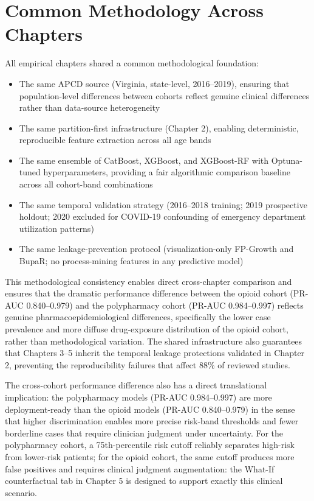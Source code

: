 \documentclass[
  12pt,
]{book}
\providecommand{\tightlist}{%
  \setlength{\itemsep}{0pt}\setlength{\parskip}{0pt}}
\begin{document}
\section{Common Methodology Across
Chapters}\label{common-methodology-across-chapters}

All empirical chapters shared a common methodological foundation:

\begin{itemize}
\tightlist
\item
  The same APCD source (Virginia, state-level, 2016--2019), ensuring
  that population-level differences between cohorts reflect genuine
  clinical differences rather than data-source heterogeneity
\item
  The same partition-first infrastructure (Chapter 2), enabling
  deterministic, reproducible feature extraction across all age bands
\item
  The same ensemble of CatBoost, XGBoost, and XGBoost-RF with
  Optuna-tuned hyperparameters, providing a fair algorithmic comparison
  baseline across all cohort-band combinations
\item
  The same temporal validation strategy (2016--2018 training; 2019
  prospective holdout; 2020 excluded for COVID-19 confounding of
  emergency department utilization patterns)
\item
  The same leakage-prevention protocol (visualization-only FP-Growth and
  BupaR; no process-mining features in any predictive model)
\end{itemize}

This methodological consistency enables direct cross-chapter comparison
and ensures that the dramatic performance difference between the opioid
cohort (PR-AUC 0.840--0.979) and the polypharmacy cohort (PR-AUC
0.984--0.997) reflects genuine pharmacoepidemiological differences,
specifically the lower case prevalence and more diffuse drug-exposure
distribution of the opioid cohort, rather than methodological variation.
The shared infrastructure also guarantees that Chapters 3--5 inherit the
temporal leakage protections validated in Chapter 2, preventing the
reproducibility failures that affect 88\% of reviewed studies.

The cross-cohort performance difference also has a direct translational
implication: the polypharmacy models (PR-AUC 0.984--0.997) are more
deployment-ready than the opioid models (PR-AUC 0.840--0.979) in the
sense that higher discrimination enables more precise risk-band
thresholds and fewer borderline cases that require clinician judgment
under uncertainty. For the polypharmacy cohort, a 75th-percentile risk
cutoff reliably separates high-risk from lower-risk patients; for the
opioid cohort, the same cutoff produces more false positives and
requires clinical judgment augmentation: the What-If counterfactual tab
in Chapter 5 is designed to support exactly this clinical scenario.
\end{document}
